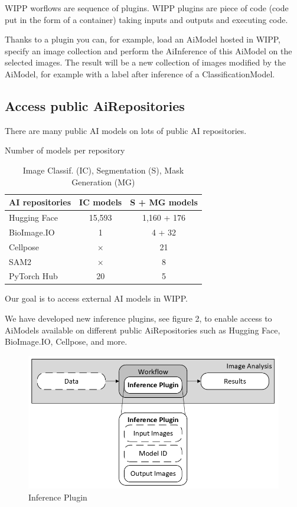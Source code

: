 WIPP worflows are sequence of plugins. WIPP plugins are piece of code (code put
in the form of a container) taking inputs and outputs and executing code.

Thanks to a plugin you can, for example, load an \Gls{AiModel} hosted in
\Gls{WIPP}, specify an
image collection and perform the \Gls{AiInference} of this \Gls{AiModel} on the
selected images.
The result will be a new collection of images modified by the \Gls{AiModel}, for
example
with a label after inference of a \Gls{ClassificationModel}.

\subsection{Access public \Gls{AiRepositories}}

There are many public AI models on lots of public AI repositories.

\begin{table}[H]
  \centering
  \caption{Number of models per repository}
  \begin{tabular}{lcc}
    \toprule
    AI repositories & IC models & S + MG models \\
    \midrule
    Hugging Face    & 15,593                      & 1,160 + 176 \\
    BioImage.IO     & 1                           & 4 + 32 \\
    Cellpose        & $\times$                    & 21 \\
    SAM2            & $\times$                    & 8 \\
    PyTorch Hub     & 20                          & 5 \\
    \bottomrule
  \end{tabular}
  \caption*{Image Classif. (IC), Segmentation (S), Mask Generation (MG)}
\end{table}

Our goal is to access external AI models in WIPP.


We have developed new inference plugins, see figure 2, to enable access to
\Gls{AiModel}s available on different public \Gls{AiRepositories} such as
Hugging Face, BioImage.IO, Cellpose, and more.

\begin{figure}[H]
  \centering
  \includegraphics[width=1.0\linewidth]{png/2_inference_plugin.png}
  \caption{Inference Plugin}
  \label{fig:2inference}
\end{figure}

